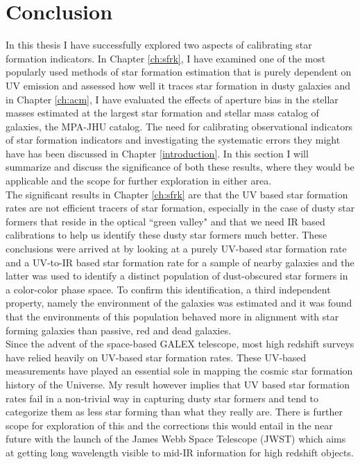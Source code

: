 \chapter{Conclusion}
\label{conclusion}

In this thesis I have successfully explored two aspects of calibrating star formation indicators. In Chapter \ref{ch:sfrk}, I have examined one of the most popularly used methods of star formation estimation that is purely dependent on UV emission and assessed how well it traces star formation in dusty galaxies and in Chapter \ref{ch:acm}, I have evaluated the effects of aperture bias in the stellar masses estimated  at the largest star formation and stellar mass catalog of galaxies, the MPA-JHU catalog. The need for calibrating observational indicators of star formation indicators and investigating the systematic errors they might have has been discussed in Chapter \ref{introduction}. In this section I will summarize and discuss the significance of both these results, where they would be applicable and the scope for further exploration in either area.\\

The significant results in Chapter \ref{ch:sfrk} are that the UV based star formation rates are not efficient tracers of star formation, especially in the case of dusty star formers that reside in the optical ``green valley" and that we need IR based calibrations to help us identify these dusty star formers much better. These conclusions were arrived at by looking at a purely UV-based star formation rate and a UV-to-IR based star formation rate for a sample of nearby galaxies and the latter was used to identify a distinct population of dust-obscured star formers in a color-color phase space. To confirm this identification, a third independent property, namely the environment of the galaxies was estimated and it was found that the environments of this population behaved more in alignment with star forming galaxies than passive, red and dead galaxies.\\

Since the advent of the space-based GALEX telescope, most high redshift surveys have relied heavily on UV-based star formation rates. These UV-based measurements have played an essential sole in mapping the cosmic star formation history of the Universe. My result however implies that UV based star formation rates fail in a non-trivial way in capturing dusty star formers and tend to categorize them as less star forming than what they really are. There is further scope for exploration of this and the corrections this would entail in the near future with the launch of the James Webb Space Telescope (JWST) which aims at getting long wavelength visible to mid-IR information for high redshift objects.\\

